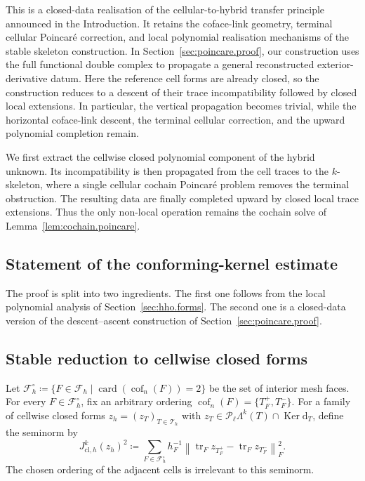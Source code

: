 \documentclass[a4paper,11pt]{article}
\theoremstyle{definition}
\newcommand{\DIFF}{\mathrm{d}}
\newcommand{\card}{\operatorname{card}}
\newcommand{\cof}[1]{\operatorname{cof}_{#1}}
\newcommand{\PL}[2]{\mathcal{P}_{#1}\Lambda^{#2}}
\newcommand{\trc}{\operatorname{tr}}
\newcommand{\Ker}{\operatorname{Ker}}
\begin{document}
This is a closed-data realisation of the cellular-to-hybrid transfer principle announced in the Introduction.
It retains the coface-link geometry, terminal cellular Poincar\'e correction, and local polynomial realisation mechanisms of the stable skeleton construction.
In Section~\ref{sec:poincare.proof}, our construction uses the full functional double complex to propagate a general reconstructed exterior-derivative datum.
Here the reference cell forms are already closed, so the construction reduces to a descent of their trace incompatibility followed by closed local extensions.
In particular, the vertical propagation becomes trivial, while the horizontal coface-link descent, the terminal cellular correction, and the upward polynomial completion remain.

We first extract the cellwise closed polynomial component of the hybrid unknown.
Its incompatibility is then propagated from the cell traces to the $k$-skeleton, where a single cellular cochain Poincar\'e problem removes the terminal obstruction.
The resulting data are finally completed upward by closed local trace extensions.
Thus the only non-local operation remains the cochain solve of Lemma~\ref{lem:cochain.poincare}.

\subsection{Statement of the conforming-kernel estimate}
\label{subsec:poincare.conforming.closed.statement}

\poincareconformingclosed*

The proof is split into two ingredients.
The first one follows from the local polynomial analysis of Section~\ref{sec:hho.forms}.
The second one is a closed-data version of the descent--ascent construction of Section~\ref{sec:poincare.proof}.

\subsection{Stable reduction to cellwise closed forms}
\label{subsec:stable.cellwise.closed.reduction}

Let $\mathcal F_h^\circ\coloneqq\{F\in\mathcal F_h\mid\card(\cof{n}(F))=2\}$ be the set of interior mesh faces.
For every $F\in\mathcal F_h^\circ$, fix an arbitrary ordering $\cof{n}(F)=\{T_F^+,T_F^-\}$.
For a family of cellwise closed forms $z_h=(z_T)_{T\in\mathcal T_h}$ with $z_T\in\PL{\ell}{k}(T)\cap\Ker\DIFF_T$, define the seminorm by
\[
  J_{\mathrm{cl},h}^k(z_h)^2
  \coloneqq
  \sum_{F\in\mathcal F_h^\circ}
  h_F^{-1}
  \left\|
    \trc_Fz_{T_F^+}
    -
    \trc_Fz_{T_F^-}
  \right\|_F^2.
\]
The chosen ordering of the adjacent cells is irrelevant to this seminorm.
\end{document}
